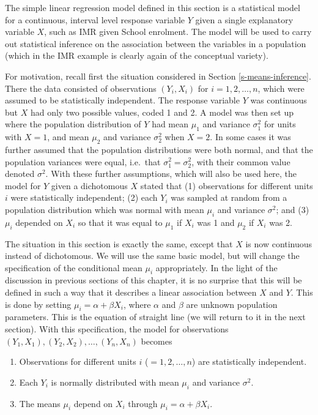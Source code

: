 \documentclass[11pt,a4paper,openany]{book}
\begin{document}
The simple linear regression model defined in this section is a
statistical model for a continuous, interval level response variable
\(Y\) given a single explanatory variable \(X\), such as IMR given
School enrolment. The model will be used to carry out statistical
inference on the association between the variables in a population
(which in the IMR example is clearly again of the conceptual variety).

For motivation, recall first the situation considered in Section
\ref{s-means-inference}. There the data consisted of observations
\((Y_{i}, X_{i})\) for \(i=1,2,\dots,n\), which were assumed to be
statistically independent. The response variable \(Y\) was continuous
but \(X\) had only two possible values, coded 1 and 2. A model was then
set up where the population distribution of \(Y\) had mean \(\mu_{1}\)
and variance \(\sigma^{2}_{1}\) for units with \(X=1\), and mean
\(\mu_{2}\) and variance \(\sigma^{2}_{2}\) when \(X=2\). In some cases
it was further assumed that the population distributions were both
normal, and that the population variances were equal, i.e.~that
\(\sigma^{2}_{1}=\sigma^{2}_{2}\), with their common value denoted
\(\sigma^{2}\). With these further assumptions, which will also be used
here, the model for \(Y\) given a dichotomous \(X\) stated that (1)
observations for different units \(i\) were statistically independent;
(2) each \(Y_{i}\) was sampled at random from a population distribution
which was normal with mean \(\mu_{i}\) and variance \(\sigma^{2}\); and
(3) \(\mu_{i}\) depended on \(X_{i}\) so that it was equal to
\(\mu_{1}\) if \(X_{i}\) was 1 and \(\mu_{2}\) if \(X_{i}\) was 2.

The situation in this section is exactly the same, except that \(X\) is
now continuous instead of dichotomous. We will use the same basic model,
but will change the specification of the conditional mean \(\mu_{i}\)
appropriately. In the light of the discussion in previous sections of
this chapter, it is no surprise that this will be defined in such a way
that it describes a linear association between \(X\) and \(Y\). This is
done by setting \(\mu_{i}=\alpha+\beta X_{i}\), where \(\alpha\) and
\(\beta\) are unknown population parameters. This is the equation of
straight line (we will return to it in the next section). With this
specification, the model for observations
\((Y_{1},X_{1}), (Y_{2}, X_{2}), \dots, (Y_{n}, X_{n})\) becomes

\begin{enumerate}
\def\labelenumi{\arabic{enumi}.}
\item
  Observations for different units \(i\) (\(=1,2,\dots,n\)) are
  statistically independent.
\item
  Each \(Y_{i}\) is normally distributed with mean \(\mu_{i}\) and
  variance \(\sigma^{2}\).
\item
  The means \(\mu_{i}\) depend on \(X_{i}\) through
  \(\mu_{i}=\alpha+\beta X_{i}\).
\end{enumerate}
\end{document}
